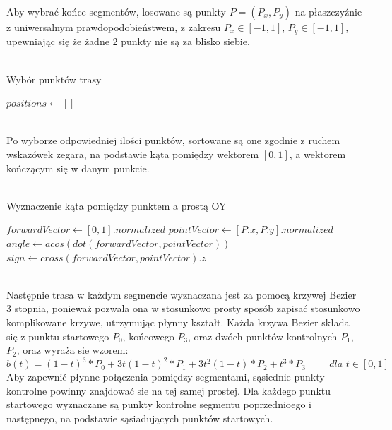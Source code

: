 Aby wybrać końce segmentów, losowane są punkty $P=(P_x,P_y)$ na płaszczyźnie z uniwersalnym prawdopodobieństwem, z zakresu $P_x \in [-1, 1]$, $P_y \in [-1, 1]$, upewniając się że żadne 2 punkty nie są za blisko siebie.
\\\phantom{.}\\
\begin{algorithm}[H]
\caption{Wybór punktów trasy}\label{alg:two}
$positions \gets []$\;
\end{algorithm}
\phantom{.}\\
Po wyborze odpowiedniej ilości punktów, sortowane są one zgodnie z ruchem wskazówek zegara, na podstawie kąta pomiędzy wektorem $[0, 1]$, a wektorem kończącym się w danym punkcie.
\\\\
\begin{algorithm}[H]
    \caption{Wyznaczenie kąta pomiędzy punktem a prostą OY}\label{alg:two}
    $forwardVector \gets [0, 1].normalized$\;
    $pointVector \gets [P.x, P.y].normalized$\;
    $angle \gets acos(dot(forwardVector, pointVector))$ 
    $sign \gets cross(forwardVector, pointVector).z$ 
     {
        \;
    }
\end{algorithm}
\phantom{.}\\
Następnie trasa w każdym segmencie wyznaczana jest za pomocą krzywej Bezier 3 stopnia, ponieważ pozwala ona w stosunkowo prosty sposób zapisać stosunkowo komplikowane krzywe, utrzymując płynny kształt. Każda krzywa Bezier składa się z punktu startowego $P_0$, końcowego $P_3$, oraz dwóch punktów kontrolnych $P_1$, $P_2$, oraz wyraża sie wzorem:
\[ b(t) = (1 - t)^3 * P_0 + 3t(1-t)^2 * P_1 + 3t^2 (1-t) * P_2 + t^3 * P_3 \hspace{1cm}\textit{dla } t \in [0, 1] \]
Aby zapewnić płynne połączenia pomiędzy segmentami, sąsiednie punkty kontrolne powinny znajdować sie na tej samej prostej. Dla każdego punktu startowego wyznaczane są punkty kontrolne segmentu poprzednioego i następnego, na podstawie sąsiadujących punktów startowych.

